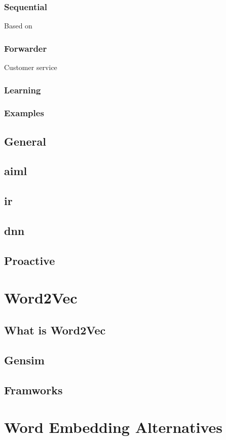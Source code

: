 \subsubsection{Sequential}
Based on
\subsubsection{Forwarder}
Customer service
\subsubsection{Learning}
\subsubsection{Examples}


\subsection{General}
\subsection{\gls{aiml}}
\subsection{\gls{ir}}
\subsection{\gls{dnn}}
\subsection{Proactive}

\section{Word2Vec}
\subsection{What is Word2Vec}
\subsection{Gensim}
\subsection{Framworks}


\section{Word Embedding Alternatives}
